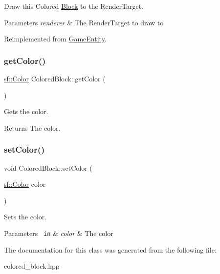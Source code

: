 Draw this Colored \mbox{\hyperlink{class_block}{Block}} to the Render\+Target. 


\begin{DoxyParams}{Parameters}
{\em renderer} & The Render\+Target to draw to \\
\hline
\end{DoxyParams}


Reimplemented from \mbox{\hyperlink{class_game_entity_ae8417c4fa668594827706c44091f7366}{Game\+Entity}}.

\mbox{\label{class_colored_block_aafdbed32b7e76c5735a25c3bccc81acc}} 
\subsubsection{\texorpdfstring{getColor()}{getColor()}}
{\footnotesize\ttfamily \mbox{\hyperlink{classsf_1_1_color}{sf\+::\+Color}} Colored\+Block\+::get\+Color (\begin{DoxyParamCaption}{ }\end{DoxyParamCaption})\hspace{0.3cm}{\ttfamily [inline]}}



Gets the color. 

\begin{DoxyReturn}{Returns}
The color. 
\end{DoxyReturn}
\mbox{\label{class_colored_block_a7df0fe6e6a760e5dff3a84de6571384c}} 
\subsubsection{\texorpdfstring{setColor()}{setColor()}}
{\footnotesize\ttfamily void Colored\+Block\+::set\+Color (\begin{DoxyParamCaption}\item[{\mbox{\hyperlink{classsf_1_1_color}{sf\+::\+Color}}}]{color }\end{DoxyParamCaption})\hspace{0.3cm}{\ttfamily [inline]}}



Sets the color. 


\begin{DoxyParams}[1]{Parameters}
\mbox{\texttt{ in}}  & {\em color} & The color \\
\hline
\end{DoxyParams}


The documentation for this class was generated from the following file\+:\begin{DoxyCompactItemize}
\item 
colored\+\_\+block.\+hpp\end{DoxyCompactItemize}
